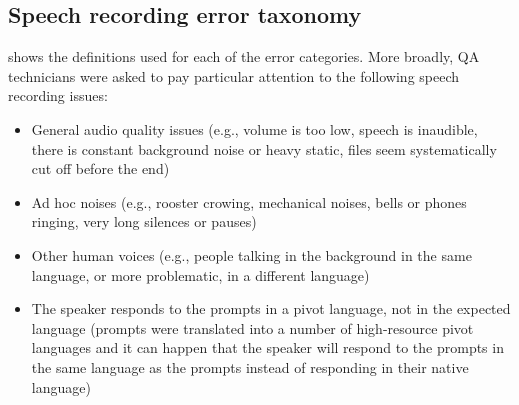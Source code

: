 \subsection{Speech recording error taxonomy}
 shows the definitions used for each of the error categories. More broadly, QA technicians were asked to pay particular attention to the following speech recording issues:
\begin{itemize}
    \item General audio quality issues (e.g., volume is too low, speech is inaudible, there is constant background noise or heavy static, files seem systematically cut off before the end)
\item Ad hoc noises (e.g., rooster crowing, mechanical noises, bells or phones ringing, very long silences or pauses)
\item Other human voices (e.g., people talking in the background in the same language, or more problematic, in a different language)
\item The speaker responds to the prompts in a pivot language, not in the expected language (prompts were translated into a number of high-resource pivot languages and it can happen that the speaker will respond to the prompts in the same language as the prompts instead of responding in their native language)

\end{itemize}

